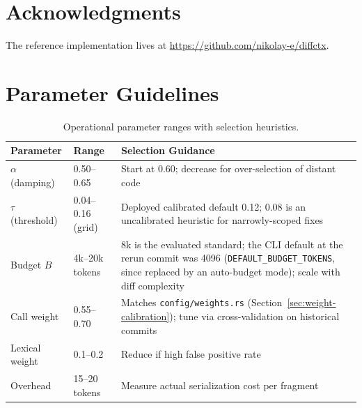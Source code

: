 \documentclass[11pt, a4paper]{article}
\begin{document}
\newpage
\section*{Acknowledgments}

The reference implementation lives at \url{https://github.com/nikolay-e/diffctx}.

\appendix

\newpage
\section{Parameter Guidelines}

\begin{table}[h]
\centering
\begin{tabular}{llp{6cm}}
\toprule
\textbf{Parameter} & \textbf{Range} & \textbf{Selection Guidance} \\
\midrule
$\alpha$ (damping) & 0.50--0.65 & Start at 0.60; decrease for over-selection of distant code \\
$\tau$ (threshold) & 0.04--0.16 (grid) & Deployed calibrated default 0.12; 0.08 is an uncalibrated heuristic for narrowly-scoped fixes \\
Budget $B$ & 4k--20k tokens & 8k is the evaluated standard; the CLI default at the rerun commit was 4096 (\texttt{DEFAULT\_BUDGET\_TOKENS}, since replaced by an auto-budget mode); scale with diff complexity \\
Call weight & 0.55--0.70 & Matches \texttt{config/weights.rs} (Section~\ref{sec:weight-calibration}); tune via cross-validation on historical commits \\
Lexical weight & 0.1--0.2 & Reduce if high false positive rate \\
Overhead & 15--20 tokens & Measure actual serialization cost per fragment \\
\bottomrule
\end{tabular}
\caption{Operational parameter ranges with selection heuristics.}
\end{table}
\end{document}
